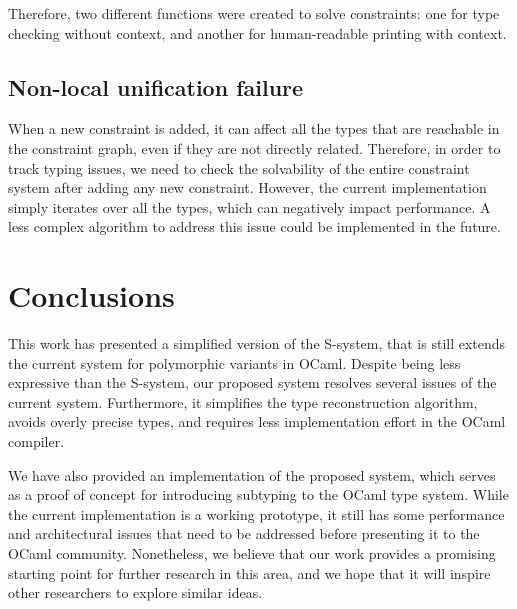 \documentclass[a4paper,11pt,oneside]{article}
\theoremstyle{definition}
\begin{document}
Therefore, two different functions were created to solve constraints: one for
type checking without context, and another for human-readable printing with
context.


\subsection{Non-local unification failure}

When a new constraint is added, it can affect all the types that are reachable
in the constraint graph, even if they are not directly related. Therefore, in
order to track typing issues, we need to check the solvability of the entire
constraint system after adding any new constraint. However, the current
implementation simply iterates over all the types, which can negatively
impact performance. A less complex algorithm to address this issue could be
implemented in the future.

\section{Conclusions}

This work has presented a simplified version of the S-system\cite{Castagna_2016},
that is still extends the current system for polymorphic variants in OCaml.
Despite being less expressive than the S-system, our proposed system resolves
several issues of the current system. Furthermore, it simplifies the type
reconstruction algorithm, avoids overly precise types, and requires less
implementation effort in the OCaml compiler.

We have also provided an implementation of the proposed system, which serves
as a proof of concept for introducing subtyping to the OCaml type system.
While the current implementation is a working prototype, it still has some
performance and architectural issues that need to be addressed before
presenting it to the OCaml community. Nonetheless, we believe that our work
provides a promising starting point for further research in this area, and
we hope that it will inspire other researchers to explore similar ideas.

\newpage

\printbibliography
\end{document}
